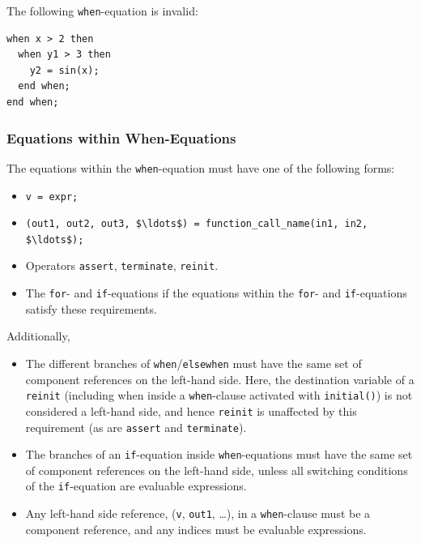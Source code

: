 \begin{example}
The following \lstinline!when!-equation is invalid:
\begin{lstlisting}[language=modelica]
when x > 2 then
  when y1 > 3 then
    y2 = sin(x);
  end when;
end when;
\end{lstlisting}
\end{example}


\subsubsection{Equations within When-Equations}\label{restrictions-on-equations-within-when-equations}\label{equations-within-when-equations}

The equations within the \lstinline!when!-equation must have one of the following forms:
\begin{itemize}
\item
  \lstinline!v = expr;!
\item
  \lstinline!(out1, out2, out3, $\ldots$) = function_call_name(in1, in2, $\ldots$);!
\item
  Operators \lstinline!assert!, \lstinline!terminate!, \lstinline!reinit!.
\item
  The \lstinline!for!- and \lstinline!if!-equations if the equations within the \lstinline!for!- and \lstinline!if!-equations satisfy these requirements.
\end{itemize}
Additionally,
\begin{itemize}
\item
  The different branches of \lstinline!when!/\lstinline!elsewhen! must have the same set of component references on the left-hand side.
  Here, the destination variable of a \lstinline!reinit! (including when inside a \lstinline!when!-clause activated with \lstinline!initial()!) is not considered a left-hand side, and hence \lstinline!reinit! is unaffected by this requirement (as are \lstinline!assert! and \lstinline!terminate!).
\item
  The branches of an \lstinline!if!-equation inside \lstinline!when!-equations must have the same set of component references on the left-hand side, unless all switching conditions of the \lstinline!if!-equation are evaluable expressions.
\item
  Any left-hand side reference, (\lstinline!v!, \lstinline!out1!, \ldots), in a \lstinline!when!-clause must be a component reference, and any indices must be evaluable expressions.
\end{itemize}


